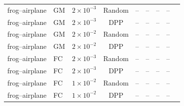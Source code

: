 \begin{table}[t]
{\begin{tabular}{lllclcccc}
\midrule

frog--airplane & GM &
$2{\times}10^{-3}$ & Random & -- & -- & -- & -- \\
frog--airplane & GM &
$2{\times}10^{-3}$ & DPP & -- & -- & -- & -- \\

frog--airplane & GM &
$2{\times}10^{-2}$ & Random & -- & -- & -- & -- \\
frog--airplane & GM &
$2{\times}10^{-2}$ & DPP & -- & -- & -- & -- \\

\addlinespace
frog--airplane & FC &
$2{\times}10^{-3}$ & Random & -- & -- & -- & -- \\
frog--airplane & FC &
$2{\times}10^{-3}$ & DPP & -- & -- & -- & -- \\

frog--airplane & FC &
$1{\times}10^{-2}$ & Random & -- & -- & -- & -- \\
frog--airplane & FC &
$1{\times}10^{-2}$ & DPP & -- & -- & -- & -- \\

\bottomrule
\end{tabular}
}
\end{table}
